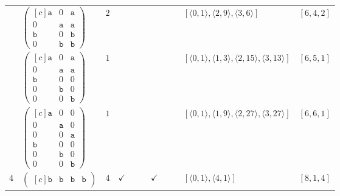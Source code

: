 \documentclass[12pt]{article}
\theoremstyle{definition}
\theoremstyle{plain}
\begin{document}
{\begin{longtable}{@{}cYcccccccZc@{}}
\cmidrule(lr){2-11}

& $\begin{pmatrix*}[c]
\mathtt{a}   & 0  &   \mathtt{a}   \\
0  &   \mathtt{a}   &  \mathtt{a}    \\
\mathtt{b} &  0  &  \mathtt{b}  \\
0  &  \mathtt{b}  &  \mathtt{b}
\end{pmatrix*}$
& $2$
&
&
&
&
&
&
& $[\langle0,1\rangle,\allowbreak\langle2,9\rangle,\allowbreak\langle3,6\rangle]$
& $[6,4,2]$
\\

\cmidrule(lr){2-11}

& $\begin{pmatrix*}[c]
\mathtt{a}   & 0  &   \mathtt{a}   \\
0  &   \mathtt{a}   &  \mathtt{a}    \\
\mathtt{b} &  0  &  0  \\
0  &  \mathtt{b}  &  0   \\
0  &  0  &  \mathtt{b}
\end{pmatrix*}$
& $1$
&
&
&
&
&
&
& $[\langle0,1\rangle,\allowbreak\langle1,3\rangle,\allowbreak\langle2,15\rangle,\allowbreak\langle3,13\rangle]$
& $[6,5,1]$
\\

\cmidrule(lr){2-11}


& $\begin{pmatrix*}[c]
\mathtt{a}   & 0  &   0   \\
0  &   \mathtt{a}   &  0    \\
0  &  0  &  \mathtt{a}   \\
\mathtt{b}   & 0  &   0   \\
0  &   \mathtt{b}   &  0    \\
0  &  0  &  \mathtt{b}
\end{pmatrix*}$
& $1$
&
&
&
&
&
&
& $[\langle0,1\rangle,\allowbreak\langle1,9\rangle,\allowbreak\langle2,27\rangle,\allowbreak\langle3,27\rangle]$
& $[6,6,1]$\\

\midrule[\heavyrulewidth]

$4$
& $\begin{pmatrix*}[c]
\mathtt{b}   &  \mathtt{b}    &  \mathtt{b}    &   \mathtt{b}
\end{pmatrix*}$
& $4$
& $\checkmark$
&
&
& $\checkmark$
&
&
& $[\langle0,1\rangle,\allowbreak\langle4,1\rangle]$
& $[8,1,4]$     \\

\cmidrule(lr){2-11}


\end{longtable}}
\end{document}
